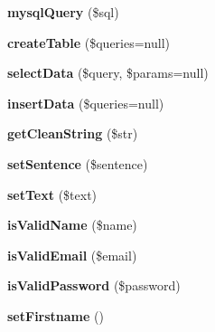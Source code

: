 \begin{DoxyCompactItemize}
\item 
\hypertarget{class_brain_a0b97d54e6f59e8645b71ee9232580588}{{\bfseries mysql\-Query} (\$sql)}\label{class_brain_a0b97d54e6f59e8645b71ee9232580588}

\item 
\hypertarget{class_brain_a22446253e918c6bb8a31dfbef15584b4}{{\bfseries create\-Table} (\$queries=null)}\label{class_brain_a22446253e918c6bb8a31dfbef15584b4}

\item 
\hypertarget{class_brain_a8450b779967fb6a1dfe188f5b6608d7c}{{\bfseries select\-Data} (\$query, \$params=null)}\label{class_brain_a8450b779967fb6a1dfe188f5b6608d7c}

\item 
\hypertarget{class_brain_ae54dd406d42f51136ae98d1aee61cdd8}{{\bfseries insert\-Data} (\$queries=null)}\label{class_brain_ae54dd406d42f51136ae98d1aee61cdd8}

\item 
\hypertarget{class_brain_a3513d9cb770b624c57e22082c4dfc72b}{{\bfseries get\-Clean\-String} (\$str)}\label{class_brain_a3513d9cb770b624c57e22082c4dfc72b}

\item 
\hypertarget{class_brain_aee1ba5635d125cda5b3dfc775d30f7c0}{{\bfseries set\-Sentence} (\$sentence)}\label{class_brain_aee1ba5635d125cda5b3dfc775d30f7c0}

\item 
\hypertarget{class_brain_aed98453b92e9e7e961179dfff24c4a3a}{{\bfseries set\-Text} (\$text)}\label{class_brain_aed98453b92e9e7e961179dfff24c4a3a}

\item 
\hypertarget{class_brain_aa688e697bf73b43eb6f93f0e9c6a9632}{{\bfseries is\-Valid\-Name} (\$name)}\label{class_brain_aa688e697bf73b43eb6f93f0e9c6a9632}

\item 
\hypertarget{class_brain_ae48b4d105b2d71bd9c3f88fdf3666058}{{\bfseries is\-Valid\-Email} (\$email)}\label{class_brain_ae48b4d105b2d71bd9c3f88fdf3666058}

\item 
\hypertarget{class_brain_aba0549d9b9a0441e8cc46643a2a6c1e5}{{\bfseries is\-Valid\-Password} (\$password)}\label{class_brain_aba0549d9b9a0441e8cc46643a2a6c1e5}

\item 
\hypertarget{class_brain_a09fa2492831611a0f641b0b17ae32d08}{{\bfseries set\-Firstname} ()}\label{class_brain_a09fa2492831611a0f641b0b17ae32d08}


\end{DoxyCompactItemize}
